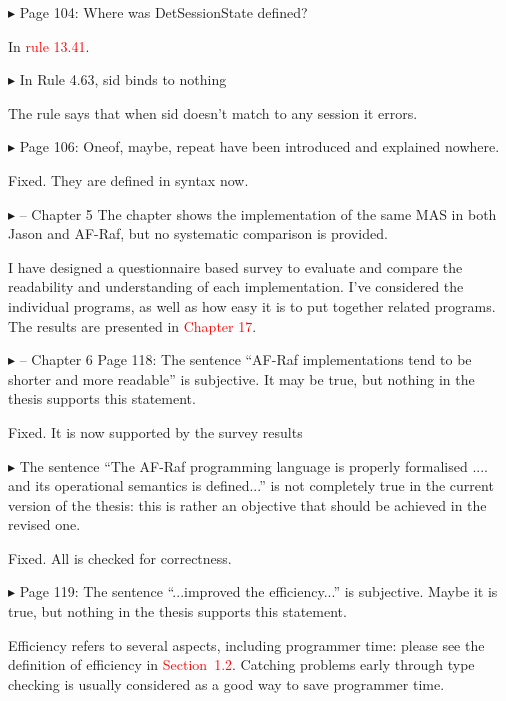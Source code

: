 \documentclass{article}
\newcommand*\R[1]{\textcolor{red}{#1}} %
\newenvironment{them}%
  {\bigskip\noindent\begingroup\color{blue}$\blacktriangleright$\enspace}%
  {\endgroup\par}
\begin{document}
\begin{them}
Page 104:
Where was DetSessionState defined?
\end{them}
In \R{rule 13.41}.

\begin{them}
In Rule 4.63, sid binds to nothing
\end{them}
The rule says that when sid doesn't match to any session it errors.

\begin{them}
Page 106:
Oneof, maybe, repeat have been introduced and explained nowhere.
\end{them}
Fixed. They are defined in syntax now.

\begin{them}
-- Chapter 5
The chapter shows the implementation of the same MAS in both Jason and AF-Raf,
but no systematic comparison is provided.
\end{them}
I have designed a questionnaire based survey to evaluate and compare the
readability and understanding of each implementation. I've considered the
individual programs, as well as how easy it is to put together related
programs. The results are presented in \R{Chapter 17}.

\begin{them}
-- Chapter 6
Page 118:
The sentence ``AF-Raf implementations tend to be shorter and more readable'' is
subjective. It may be true, but nothing in the thesis supports this statement.
\end{them}
Fixed. It is now supported by the survey results

\begin{them}
The sentence ``The AF-Raf programming language is properly formalised .... and
its operational semantics is defined...'' is not completely true in the current
version of the thesis: this is rather an objective that should be achieved in
the revised one.
\end{them}
Fixed. All is checked for correctness.

\begin{them}
Page 119:
The sentence ``...improved the efficiency...'' is subjective. Maybe it is true,
but nothing in the thesis supports this statement.
\end{them}
Efficiency refers to several aspects, including programmer time:
  please see the definition of efficiency in \R{Section~1.2}.
Catching problems early through type checking
  is usually considered as a good way to save programmer time.

\end{document}
